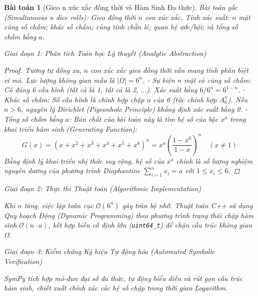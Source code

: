 \documentclass{article}
\newtheorem{baitoan}{Bài toán}
\begin{document}
\begin{baitoan}[Gieo n xúc xắc đồng thời và Hàm Sinh Đa thức]
 \emph{Bài toán gốc (Simultaneous n dice rolls):} 
 Gieo đồng thời $n$ con xúc xắc. Tính xác suất: $n$ mặt cùng số chấm; khác số chấm; cùng tính chẵn lẻ; quan hệ ước/bội; và tổng số chấm bằng $a$.

\vspace{0.5em}\noindent\emph{Giai đoạn 1: Phân tích Toán học Lý thuyết (Analytic Abstraction)}
 
 \begin{proof}
 Tương tự đồng xu, $n$ con xúc xắc gieo đồng thời vẫn mang tính phân biệt vĩ mô. Lực lượng không gian mẫu là $|\Omega| = 6^n$. 
 - Sự kiện $n$ mặt có cùng số chấm: Có đúng 6 cấu hình (tất cả là 1, tất cả là 2, $\dots$). Xác suất bằng $6 / 6^n = 6^{1-n}$.
 - Khác số chấm: Số cấu hình là chỉnh hợp chập $n$ của 6 (tức chỉnh hợp $A_6^n$). Nếu $n > 6$, nguyên lý Dirichlet (Pigeonhole Principle) khẳng định xác suất bằng 0.
 - Tổng số chấm bằng $a$: Bản chất của bài toán này là tìm hệ số của bậc $x^a$ trong khai triển hàm sinh (Generating Function):
 \begin{equation}
 G(x) = (x + x^2 + x^3 + x^4 + x^5 + x^6)^n = x^n \left(\frac{1 - x^6}{1 - x}\right)^n \quad (x \neq 1)
 \end{equation}
 Bằng định lý khai triển nhị thức suy rộng, hệ số của $x^a$ chính là số lượng nghiệm nguyên dương của phương trình Diophantine $\sum_{i=1}^n x_i = a$ với $1 \le x_i \le 6$.
 \end{proof}

\vspace{0.5em}\noindent\emph{Giai đoạn 2: Thực thi Thuật toán (Algorithmic Implementation)}
 
 Khi $n$ tăng, việc lặp toàn cục $\mathcal{O}(6^n)$ gây tràn bộ nhớ. Thuật toán C++ sử dụng Quy hoạch Động (Dynamic Programming) theo phương trình trạng thái chập hàm sinh $\mathcal{O}(n \cdot a)$, kết hợp biến cố định lớn (\texttt{uint64\_t}) để chặn cấu trúc không gian $\Omega$.



\vspace{0.5em}\noindent\emph{Giai đoạn 3: Kiểm chứng Ký hiệu Tự động hóa (Automated Symbolic Verification)}
 
 \textsf{SymPy} tích hợp mô-đun đại số đa thức, tự động biểu diễn và rút gọn cấu trúc hàm sinh, chiết xuất chính xác các hệ số chập trong thời gian Logarithm.


\end{baitoan}
\end{document}
